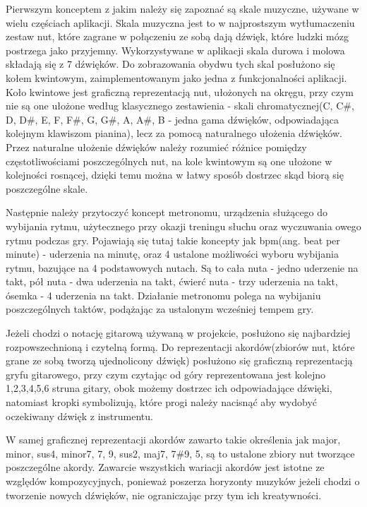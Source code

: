 Pierwszym konceptem z jakim należy się zapoznać są skale muzyczne, używane w wielu częściach aplikacji. Skala muzyczna jest to w najprostszym wytłumaczeniu zestaw nut, które zagrane w połączeniu ze sobą dają dźwięk, które ludzki mózg postrzega jako przyjemny. Wykorzystywane w aplikacji skala durowa i molowa składają się z 7 dźwięków. Do zobrazowania obydwu tych skal posłużono się kołem kwintowym, zaimplementowanym jako jedna z funkcjonalności aplikacji. Koło kwintowe jest graficzną reprezentacją nut, ułożonych na okręgu, przy czym nie są one ułożone według klasycznego zestawienia - skali chromatycznej(C, C\#, D, D\#, E, F, F\#, G, G\#, A, A\#, B - jedna gama dźwięków, odpowiadająca kolejnym klawiszom pianina), lecz za pomocą naturalnego ułożenia dźwięków. Przez naturalne ułożenie dźwięków należy rozumieć różnice pomiędzy częstotliwościami poszczególnych nut, na kole kwintowym są one ułożone w kolejności rosnącej, dzięki temu można w łatwy sposób dostrzec skąd biorą się poszczególne skale. 

Następnie należy przytoczyć koncept metronomu, urządzenia służącego do wybijania rytmu, użytecznego przy okazji treningu słuchu oraz wyczuwania owego rytmu podczas gry. Pojawiają się tutaj takie koncepty jak bpm(ang. beat per minute) - uderzenia na minutę, oraz 4 ustalone możliwości wyboru wybijania rytmu, bazujące na 4 podstawowych nutach. Są to cała nuta - jedno uderzenie na takt, pół nuta - dwa uderzenia na takt, ćwierć nuta - trzy uderzenia na takt, ósemka - 4 uderzenia na takt. Działanie metronomu polega na wybijaniu poszczególnych taktów, podążając za ustalonym wcześniej tempem gry. 

Jeżeli chodzi o notację gitarową używaną w projekcie, posłużono się najbardziej rozpowszechnioną i czytelną formą. Do reprezentacji akordów(zbiorów nut, które grane ze sobą tworzą ujednolicony dźwięk) posłużono się graficzną reprezentacją gryfu gitarowego, przy czym czytając od góry reprezentowana jest kolejno 1,2,3,4,5,6 struna gitary, obok możemy dostrzec ich odpowiadające dźwięki, natomiast kropki symbolizują, które progi należy nacisnąć aby wydobyć oczekiwany dźwięk z instrumentu.

W samej graficznej reprezentacji akordów zawarto takie określenia jak major, minor, sus4, minor7, 7, 9, sus2, maj7, 7\#9, 5, są to ustalone zbiory nut tworzące poszczególne akordy. Zawarcie wszystkich wariacji akordów jest istotne ze względów kompozycyjnych, ponieważ poszerza horyzonty muzyków jeżeli chodzi o tworzenie nowych dźwięków, nie ograniczając przy tym ich kreatywności. 

